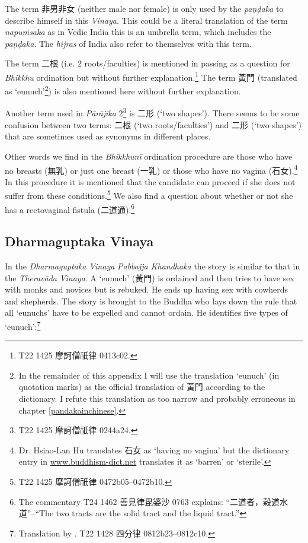 The term 非男非女 (neither male nor female) is only used by the {\em paṇḍaka} to describe himself in this {\em Vinaya}. This could be a literal translation of the term {\em napuṁsaka} as in Vedic India this is an umbrella term, which includes the {\em paṇḍaka}. The {\em hijras} of India also refer to themselves with this term.

The term 二根 (i.e. 2 roots/faculties) is mentioned in passing as a question for {\em Bhikkhu} ordination but without further explanation.\footnote{T22 1425 摩訶僧祇律 0413c02.} The term 黃門 (translated as `eunuch'\footnote{In the remainder of this appendix I will use the translation `eunuch' (in quotation marks) as the official translation of 黃門 according to the dictionary. I refute this translation as too narrow and probably erroneous in chapter \ref{pandakainchinese}.}) is also mentioned here without further explanation.

Another term used in {\em Pārājika} 2\footnote{T22 1425 摩訶僧祇律 0244a24.} is 二形 (`two shapes'). There seems to be some confusion between two terms: 二根 (`two roots/faculties') and 二形 (`two shapes') that are sometimes used as synonyms in different places.

Other words we find in the {\em Bhikkhunī} ordination procedure are those who have no breasts (無乳) or just one breast (一乳) or those who have no vagina (石女).\footnote{Dr. Hsiao-Lan Hu translates 石女 as `having no vagina' but the dictionary entry in \href{http://www.buddhism-dict.net/cgi-bin/xpr-ddb.pl?q=石女}{www.buddhism-dict.net} translates it as `barren' or `sterile'.} In this procedure it is mentioned that the candidate can proceed if she does not suffer from these conditions.\footnote{T22 1425 摩訶僧祇律 0472b05–0472b10.} We also find a question about whether or not she has a rectovaginal fistula (二道通).\footnote{The commentary T24 1462 善見律毘婆沙 0763 explains: ``二道者，穀道水道''--``The two tracts are the solid tract and the liquid tract.''}

\subsection{Dharmaguptaka Vinaya}
In the {\em Dharmaguptaka} {\em Vinaya} {\em Pabbajja Khandhaka} the story is similar to that in the {\em Theravāda} {\em Vinaya}. A `eunuch' (黃門) is ordained and then tries to have sex with monks and novices but is rebuked. He ends up having sex with cowherds and shepherds. The story is brought to the Buddha who lays down the rule that all `eunuchs' have to be expelled and cannot ordain. He identifies five types of `eunuch':\footnote{Translation by \cite{bodhi}. T22 1428 四分律 0812b23–0812c10.} 

